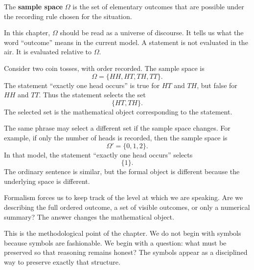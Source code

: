 \begin{definitionbox}
The \textbf{sample space} \(\Omega\) is the set of elementary outcomes that are possible under the recording rule chosen for the situation.
\end{definitionbox}

In this chapter, \(\Omega\) should be read as a universe of discourse. It tells us what the word ``outcome'' means in the current model. A statement is not evaluated in the air. It is evaluated relative to \(\Omega\).

\begin{examplebox}
Consider two coin tosses, with order recorded. The sample space is
\[
\Omega=\{HH,HT,TH,TT\}.
\]
The statement ``exactly one head occurs'' is true for \(HT\) and \(TH\), but false for \(HH\) and \(TT\). Thus the statement selects the set
\[
\{HT,TH\}.
\]
The selected set is the mathematical object corresponding to the statement.
\end{examplebox}

The same phrase may select a different set if the sample space changes. For example, if only the number of heads is recorded, then the sample space is
\[
\Omega' = \{0,1,2\}.
\]
In that model, the statement ``exactly one head occurs'' selects
\[
\{1\}.
\]
The ordinary sentence is similar, but the formal object is different because the underlying space is different.

\begin{remarkbox}
Formalism forces us to keep track of the level at which we are speaking. Are we describing the full ordered outcome, a set of visible outcomes, or only a numerical summary? The answer changes the mathematical object.
\end{remarkbox}

This is the methodological point of the chapter. We do not begin with symbols because symbols are fashionable. We begin with a question: what must be preserved so that reasoning remains honest? The symbols appear as a disciplined way to preserve exactly that structure.
